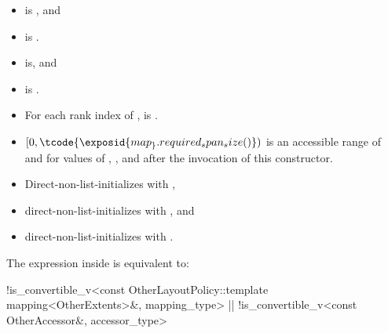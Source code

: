 \begin{itemdescr}
\pnum
\constraints
\begin{itemize}
\item
{}
is , and
\item
{} is .
\end{itemize}

\pnum
\mandates
\begin{itemize}
\item
{} is\newline {}, and
\item
{} is .
\end{itemize}

\pnum
\expects
\begin{itemize}
\item
For each rank index  of ,
is .
\item
$[0, \tcode{\exposid{map_}.required_span_size()})$ is
an accessible range of  and 
for values of , , and 
after the invocation of this constructor.
\end{itemize}

\pnum
\effects
\begin{itemize}
\item
Direct-non-list-initializes  with ,
\item
direct-non-list-initializes  with , and
\item
direct-non-list-initializes  with .
\end{itemize}

\pnum
\remarks
The expression inside  is equivalent to:
\begin{codeblock}
!is_convertible_v<const OtherLayoutPolicy::template mapping<OtherExtents>&, mapping_type>
|| !is_convertible_v<const OtherAccessor&, accessor_type>
\end{codeblock}
\end{itemdescr}

